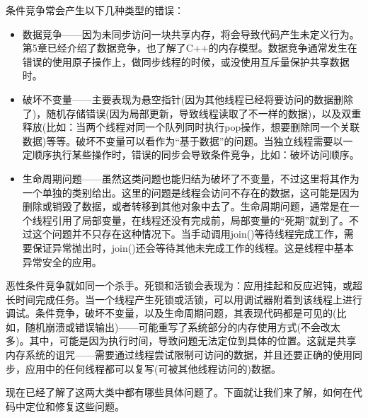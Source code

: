 条件竞争常会产生以下几种类型的错误：

\begin{itemize}
\item 数据竞争——因为未同步访问一块共享内存，将会导致代码产生未定义行为。第5章已经介绍了数据竞争，也了解了C++的内存模型。数据竞争通常发生在错误的使用原子操作上，做同步线程的时候，或没使用互斥量保护共享数据时。
\item 破坏不变量——主要表现为悬空指针(因为其他线程已经将要访问的数据删除了)，随机存储错误(因为局部更新，导致线程读取了不一样的数据)，以及双重释放(比如：当两个线程对同一个队列同时执行pop操作，想要删除同一个关联数据)等等。破坏不变量可以看作为“基于数据”的问题。当独立线程需要以一定顺序执行某些操作时，错误的同步会导致条件竞争，比如：破坏访问顺序。
\item 生命周期问题——虽然这类问题也能归结为破坏了不变量，不过这里将其作为一个单独的类别给出。这里的问题是线程会访问不存在的数据，这可能是因为删除或销毁了数据，或者转移到其他对象中去了。生命周期问题，通常是在一个线程引用了局部变量，在线程还没有完成前，局部变量的“死期”就到了。不过这个问题并不只存在这种情况下。当手动调用join()等待线程完成工作，需要保证异常抛出时，join()还会等待其他未完成工作的线程。这是线程中基本异常安全的应用。
\end{itemize}

恶性条件竞争就如同一个杀手。死锁和活锁会表现为：应用挂起和反应迟钝，或超长时间完成任务。当一个线程产生死锁或活锁，可以用调试器附着到该线程上进行调试。条件竞争，破坏不变量，以及生命周期问题，其表现代码都是可见的(比如，随机崩溃或错误输出)——可能重写了系统部分的内存使用方式(不会改太多)。其中，可能是因为执行时间，导致问题无法定位到具体的位置。这就是共享内存系统的诅咒——需要通过线程尝试限制可访问的数据，并且还要正确的使用同步，应用中的任何线程都可以复写(可被其他线程访问的)数据。

现在已经了解了这两大类中都有哪些具体问题了。下面就让我们来了解，如何在代码中定位和修复这些问题。